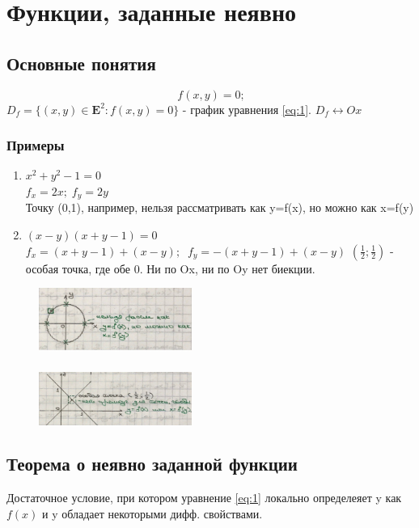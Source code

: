
\section{Функции, заданные неявно}
\subsection{Основные понятия}
\begin{equation} \label{eq:1}\
f(x,y)=0; 
\end{equation}
$D_{f}=\{(x,y)\in\mathbf{E}^2: f(x,y)=0 \} $  - график уравнения \ref{eq:1}. $D_f \leftrightarrow Ox$


\begin{minipage}{100mm}
	\subsubsection{Примеры}
	\begin{enumerate}
		\item $x^2+y^2-1=0$ \\
		$f_x=2x; \; f_y=2y$ \\
		Точку (0,1), например, нельзя рассматривать как y=f(x), но можно как x=f(y)
		\item$ (x-y)(x+y-1)=0$ \\
		$f_x=(x+y-1)+(x-y); \;\; f_y=-(x+y-1)+(x-y)$
		$(\frac 1 2;\frac 1 2)$ - особая точка, где обе 0.  Ни по Ox, ни по Oy нет биекции.
	\end{enumerate}
\end{minipage}
\begin{minipage}{70mm}
	\begin{figure}[H]
		\includegraphics[width=50mm]{lect1pic1}
		\\
		\\
		\includegraphics[width=50mm]{lect1pic2}
		\\
	\end{figure}
\end{minipage}

\subsection{Теорема о неявно заданной функции}
Достаточное условие, при котором уравнение \ref{eq:1} локально определеяет y как $f(x)$ и y обладает некоторыми дифф. свойствами.

